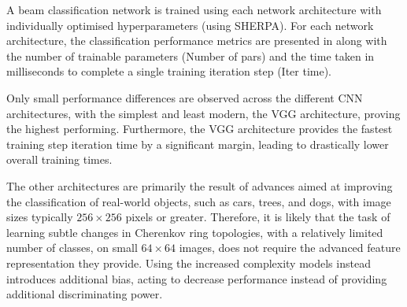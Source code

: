 A beam classification network is trained using each network architecture with individually
optimised hyperparameters (using SHERPA). For each network architecture, the classification
performance metrics are presented in  along with the number of trainable
parameters (Number of pars) and the time taken in milliseconds to complete a single training
iteration step (Iter time).

\begin{table} %
    \caption[Classification performance metrics for different network architectures]
    {Classification performance metrics for the different network architectures. The highest
        scoring values for each metric are indicated in bold. The given errors correspond to the
        statistical uncertainty only.}
    \label{tab:arch}
\end{table}

Only small performance differences are observed across the different CNN architectures, with the
simplest and least modern, the VGG architecture, proving the highest performing. Furthermore, the
VGG architecture provides the fastest training step iteration time by a significant margin,
leading to drastically lower overall training times.

The other architectures are primarily the result of advances aimed at improving the classification
of real-world objects, such as cars, trees, and dogs, with image sizes typically $256\times256$
pixels or greater. Therefore, it is likely that the task of learning subtle changes in Cherenkov
ring topologies, with a relatively limited number of classes, on small $64\times64$ images, does
not require the advanced feature representation they provide. Using the increased complexity
models instead introduces additional bias, acting to decrease performance instead of providing
additional discriminating power.